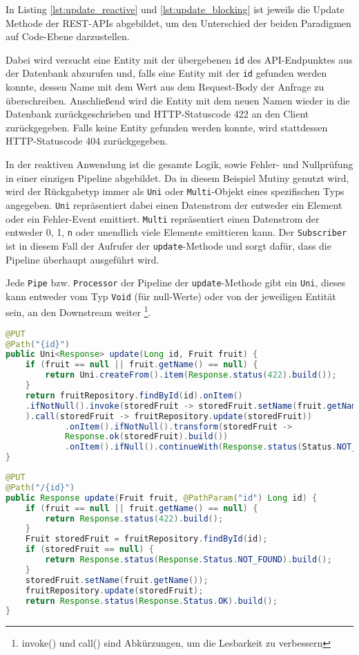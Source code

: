 In Listing \ref{lst:update_reactive} und \ref{lst:update_blocking} ist jeweils die Update Methode der REST-APIs abgebildet, um den
Unterschied der beiden Paradigmen auf Code-Ebene darzustellen.

Dabei wird versucht eine Entity mit der übergebenen \verb|id| des API-Endpunktes
aus der Datenbank abzurufen und, falls eine Entity mit der \verb|id| gefunden werden konnte, dessen Name mit dem Wert
aus dem Request-Body der Anfrage zu überschreiben. Anschließend wird die Entity mit dem neuen Namen wieder in die Datenbank zurückgeschrieben
und HTTP-Statuscode 422 an den Client zurückgegeben. Falls keine Entity gefunden werden konnte, wird stattdessen
HTTP-Statuscode 404 zurückgegeben.

In der reaktiven Anwendung ist die gesamte Logik, sowie Fehler- und Nullprüfung in einer einzigen Pipeline abgebildet.
Da in diesem Beispiel Mutiny genutzt wird, wird der Rückgabetyp immer als \verb|Uni| oder \verb|Multi|-Objekt eines spezifischen Typs
angegeben. \verb|Uni| repräsentiert dabei einen Datenstrom der entweder ein Element oder ein Fehler-Event emittiert.
\verb|Multi| repräsentiert einen Datenstrom der entweder 0, 1, \verb|n| oder unendlich viele Elemente emittieren kann.
Der \verb|Subscriber| ist in diesem Fall der Aufrufer der \verb|update|-Methode und sorgt dafür, dass die Pipeline überhaupt ausgeführt wird.

Jede \verb|Pipe| bzw. \verb|Processor| der Pipeline der \verb|update|-Methode gibt ein \verb|Uni|, dieses kann entweder
vom Typ \verb|Void| (für null-Werte) oder von der jeweiligen Entität sein, an den Downstream weiter
\footnote{invoke() und call() sind Abkürzungen, um die Lesbarkeit zu verbessern\parencite{MutinyShortcuts}}.

\begin{lstlisting}[caption=Update Methode der reaktiven Anwendung, language=Java, captionpos=b, label=lst:update_reactive]
@PUT
@Path("{id}")
public Uni<Response> update(Long id, Fruit fruit) {
	if (fruit == null || fruit.getName() == null) {
		return Uni.createFrom().item(Response.status(422).build());
	}
	return fruitRepository.findById(id).onItem()
	.ifNotNull().invoke(storedFruit -> storedFruit.setName(fruit.getName())
	).call(storedFruit -> fruitRepository.update(storedFruit))
			.onItem().ifNotNull().transform(storedFruit ->
			Response.ok(storedFruit).build())
			.onItem().ifNull().continueWith(Response.status(Status.NOT_FOUND).build());
}
\end{lstlisting}
\begin{lstlisting}[caption=Update Methode der nicht-reaktiven Anwendung, language=Java, captionpos=b, label=lst:update_blocking]
@PUT
@Path("/{id}")
public Response update(Fruit fruit, @PathParam("id") Long id) {
	if (fruit == null || fruit.getName() == null) {
		return Response.status(422).build();
	}
	Fruit storedFruit = fruitRepository.findById(id);
	if (storedFruit == null) {
		return Response.status(Response.Status.NOT_FOUND).build();
	}
	storedFruit.setName(fruit.getName());
	fruitRepository.update(storedFruit);
	return Response.status(Response.Status.OK).build();
}
\end{lstlisting}

